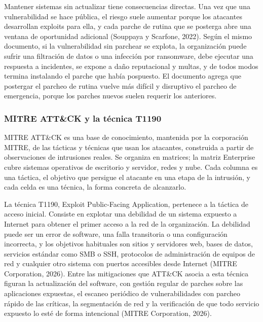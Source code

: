Mantener sistemas sin actualizar tiene consecuencias directas. Una vez que una vulnerabilidad se
hace pública, el riesgo suele aumentar porque los atacantes desarrollan exploits para ella, y
cada parche de rutina que se posterga abre una ventana de oportunidad adicional (Souppaya y
Scarfone, 2022). Según el mismo documento, si la vulnerabilidad sin parchear se explota, la
organización puede sufrir una filtración de datos o una infección por ransomware, debe ejecutar
una respuesta a incidentes, se expone a daño reputacional y multas, y de todos modos termina
instalando el parche que había pospuesto. El documento agrega que postergar el parcheo de rutina
vuelve más difícil y disruptivo el parcheo de emergencia, porque los parches nuevos suelen
requerir los anteriores.

\subsubsection{MITRE ATT\&CK y la técnica T1190}
\label{subsubsec:attack-t1190}

MITRE ATT\&CK es una base de conocimiento, mantenida por la corporación MITRE, de las tácticas
y técnicas que usan los atacantes, construida a partir de observaciones de intrusiones reales.
Se organiza en matrices; la matriz Enterprise cubre sistemas operativos de escritorio y
servidor, redes y nube. Cada columna es una táctica, el objetivo que persigue el atacante en una
etapa de la intrusión, y cada celda es una técnica, la forma concreta de alcanzarlo.

La técnica T1190, Exploit Public-Facing Application, pertenece a la táctica de acceso inicial.
Consiste en explotar una debilidad de un sistema expuesto a Internet para obtener el primer
acceso a la red de la organización. La debilidad puede ser un error de software, una falla
transitoria o una configuración incorrecta, y los objetivos habituales son sitios y servidores
web, bases de datos, servicios estándar como SMB o SSH, protocolos de administración de equipos
de red y cualquier otro sistema con puertos accesibles desde Internet (MITRE Corporation, 2026).
Entre las mitigaciones que ATT\&CK asocia a esta técnica figuran la actualización del software,
con gestión regular de parches sobre las aplicaciones expuestas, el escaneo periódico de
vulnerabilidades con parcheo rápido de las críticas, la segmentación de red y la verificación de
que todo servicio expuesto lo esté de forma intencional (MITRE Corporation, 2026).
